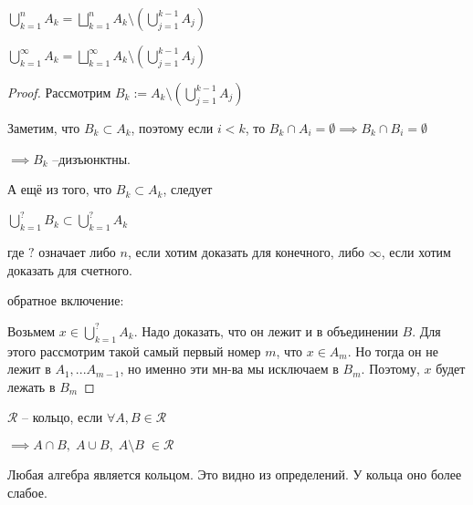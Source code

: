 
\begin{lemma}\thmslashn
	
	$\bigcup\limits_{k=1}^{n} A_k = \bigsqcup\limits_{k=1}^{n} A_k \setminus (\bigcup\limits_{j=1}^{k-1} A_j)$
	
	
	$\bigcup\limits_{k=1}^{\infty} A_k = \bigsqcup\limits_{k=1}^{\infty} A_k \setminus (\bigcup\limits_{j=1}^{k-1} A_j)$
\end{lemma}

\begin{proof}\thmslashn
	
	Рассмотрим $B_k := A_k \setminus  (\bigcup\limits_{j=1}^{k-1} A_j)$

	Заметим, что $B_k \subset A_k$, поэтому если $i < k$, то $B_k \cap A_i = \emptyset \implies B_k \cap B_i = \emptyset$
	
	$\implies B_k$ --дизъюнктны.
	
	А ещё из того, что $B_k \subset A_k$, следует
	
	$\bigcup\limits_{k=1}^{?} B_k  \subset \bigcup\limits_{k=1}^{?} A_k$

	где $?$ означает либо $n$, если хотим доказать для конечного, либо $\infty$, если хотим доказать для счетного.
	
	обратное включение:
	
	Возьмем $x \in \bigcup\limits_{k=1}^{?} A_k $. Надо доказать, что он лежит и в объединении $B$. Для этого рассмотрим такой самый первый номер $m$, что $x\in A_m$. Но тогда он не лежит в $A_1,...A_{m-1}$, но именно эти мн-ва мы исключаем в $B_m$. Поэтому, $x$ будет лежать в $B_m$

\end{proof}



\begin{definition}\thmslashn
	
	$\mathcal{R}$ -- кольцо, если $\forall A,B \in \mathcal{R}$
	
	$\implies A\cap B ,\; A\cup B,\; A\setminus B\;\in \mathcal{R}$
\end{definition}

\begin{remark}\thmslashn
	
	Любая алгебра является кольцом. Это видно из определений. У кольца оно более слабое.
	
\end{remark}

